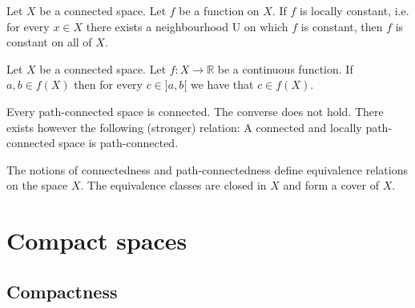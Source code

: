 	
	\begin{property}
		Let $X$ be a connected space. Let $f$ be a function on $X$. If $f$ is locally constant, i.e. for every $x\in X$ there exists a neighbourhood U on which $f$ is constant, then $f$ is constant on all of $X$.
	\end{property}
	
	\begin{theorem}\label{topology:theorem:intermediate_value_theorem}
		Let $X$ be a connected space. Let $f:X\rightarrow\mathbb{R}$ be a continuous function. If $a, b\in f(X)$ then for every $c\in ]a, b[$ we have that $c\in f(X)$.
	\end{theorem}

	
	\begin{property}
		Every path-connected space is connected. The converse does not hold. There exists however the following (stronger) relation: A connected and locally path-connected space is path-connected.
	\end{property}
	
	\begin{remark}
		The notions of connectedness and path-connectedness define equivalence relations on the space $X$. The equivalence classes are closed in $X$ and form a cover of $X$.
	\end{remark}

\section{Compact spaces}
\subsection{Compactness}
	
